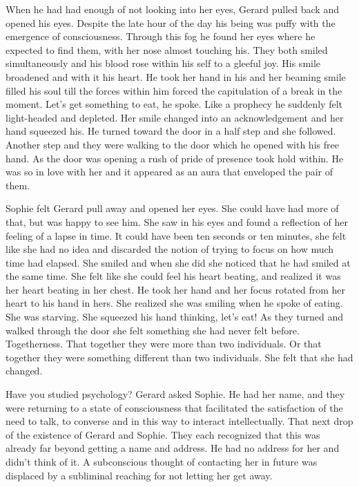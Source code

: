 When he had had enough of not looking into her eyes, Gerard pulled
back and opened his eyes.  Despite the late hour of the day his being
was puffy with the emergence of consciousness.  Through this fog he
found her eyes where he expected to find them, with her nose almost
touching his.  They both smiled simultaneously and his blood rose
within his self to a gleeful joy.  His smile broadened and with it his
heart.  He took her hand in his and her beaming smile filled his soul
till the forces within him forced the capitulation of a break in the
moment.  Let's get something to eat, he spoke.  Like a prophecy he
suddenly felt light-headed and depleted.  Her smile changed into an
acknowledgement and her hand squeezed his.  He turned toward the door
in a half step and she followed.  Another step and they were walking
to the door which he opened with his free hand.  As the door was
opening a rush of pride of presence took hold within.  He was so in
love with her and it appeared as an aura that enveloped the pair of
them.



Sophie felt Gerard pull away and opened her eyes.  She could have had
more of that, but was happy to see him.  She saw in his eyes and found
a reflection of her feeling of a lapse in time.  It could have been
ten seconds or ten minutes, she felt like she had no idea and
discarded the notion of trying to focus on how much time had elapsed.
She smiled and when she did she noticed that he had smiled at the same
time.  She felt like she could feel his heart beating, and realized it
was her heart beating in her chest.  He took her hand and her focus
rotated from her heart to his hand in hers.  She realized she was
smiling when he spoke of eating.  She was starving.  She squeezed his
hand thinking, let's eat!  As they turned and walked through the door
she felt something she had never felt before.  Togetherness.  That
together they were more than two individuals.  Or that together they
were something different than two individuals.  She felt that she had
changed.



Have you studied psychology?  Gerard asked Sophie.  He had her name,
and they were returning to a state of consciousness that facilitated
the satisfaction of the need to talk, to converse and in this way to
interact intellectually.  That next drop of the existence of Gerard
and Sophie.  They each recognized that this was already far beyond
getting a name and address.  He had no address for her and didn't
think of it.  A subconscious thought of contacting her in future was
displaced by a subliminal reaching for not letting her get away.  

